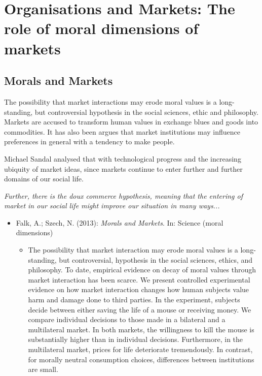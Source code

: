 
\chapter{Organisations and Markets: The role of moral dimensions of markets}


\section{Morals and Markets}

The possibility that market interactions may erode moral values is a long-standing, but controversial hypothesis in the social sciences, ethic and philosophy. Markets are accused to transform human values in exchange blues and goods into commodities. It has also been argues that market institutions may influence preferences in general with a tendency to make people.

Michael Sandal analysed that with technological progress and the increasing ubiquity of market ideas, since markets continue to enter further and further domains of our social life.

\textit{Further, there is the doux commerce hypothesis, meaning that the entering of market in our social life might improve our situation in many ways...}

\begin{itemize}
	\item Falk, A.; Szech, N. (2013): \textit{Morals and Markets}. In: Science (moral dimensions)
		\begin{itemize}
			\item The possibility that market interaction may erode moral values is a long-standing, but controversial, hypothesis in the social sciences, ethics, and philosophy. To date, empirical evidence on decay of moral values through market interaction has been scarce. We present controlled experimental evidence on how market interaction changes how human subjects value harm and damage done to third parties. In the experiment, subjects decide between either saving the life of a mouse or receiving money. We compare individual decisions to those made in a bilateral and a multilateral market. In both markets, the willingness to kill the mouse is substantially higher than in individual decisions. Furthermore, in the multilateral market, prices for life deteriorate tremendously. In contrast, for morally neutral consumption choices, differences between institutions are small.
		\end{itemize}
\end{itemize}

